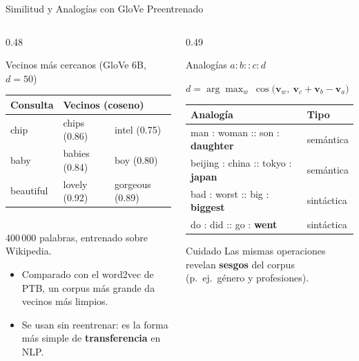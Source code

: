 \documentclass[aspectratio=169, 10pt]{beamer}
\newcommand{\formula}[1]{%
	\begin{tcolorbox}[colback=UCMBlue!8, colframe=UCMBlue, arc=4pt,
		boxsep=2pt, left=6pt, right=6pt, top=3pt, bottom=3pt]
		#1
	\end{tcolorbox}
}
\begin{document}
\begin{frame}{Similitud y Analog\'ias con GloVe Preentrenado}

	\begin{columns}[T]
		\begin{column}{0.48\textwidth}
			\begin{block}{Vecinos m\'as cercanos (GloVe 6B, $d=50$)}
				\scriptsize
				\begin{tabular}{@{}lll@{}}
					\toprule
					Consulta & \multicolumn{2}{l}{Vecinos (coseno)} \\
					\midrule
					chip & chips (0.86) & intel (0.75) \\
					baby & babies (0.84) & boy (0.80) \\
					beautiful & lovely (0.92) & gorgeous (0.89) \\
					\bottomrule
				\end{tabular}
				\\[3pt]
				400\,000 palabras, entrenado sobre Wikipedia.
			\end{block}

			\small
			\begin{itemize}
				\item Comparado con el word2vec de PTB, un corpus m\'as grande da vecinos m\'as limpios.
				\item Se usan sin reentrenar: es la forma m\'as simple de \textbf{transferencia} en NLP.
			\end{itemize}
		\end{column}

		\begin{column}{0.49\textwidth}
			\begin{block}{Analog\'ias $a : b :: c : d$}
				\formula{\centering $d = \arg\max_{w}\ \cos\big(\mathbf{v}_w,\ \mathbf{v}_c + \mathbf{v}_b - \mathbf{v}_a\big)$}
				\scriptsize
				\begin{tabular}{@{}ll@{}}
					\toprule
					Analog\'ia & Tipo \\
					\midrule
					man : woman :: son : \textbf{daughter} & sem\'antica \\
					beijing : china :: tokyo : \textbf{japan} & sem\'antica \\
					bad : worst :: big : \textbf{biggest} & sint\'actica \\
					do : did :: go : \textbf{went} & sint\'actica \\
					\bottomrule
				\end{tabular}
			\end{block}

			\begin{alertblock}{Cuidado}
				\small
				Las mismas operaciones revelan \textbf{sesgos} del corpus (p.\ ej.\ g\'enero y profesiones).
			\end{alertblock}
		\end{column}
	\end{columns}

\end{frame}
\end{document}
